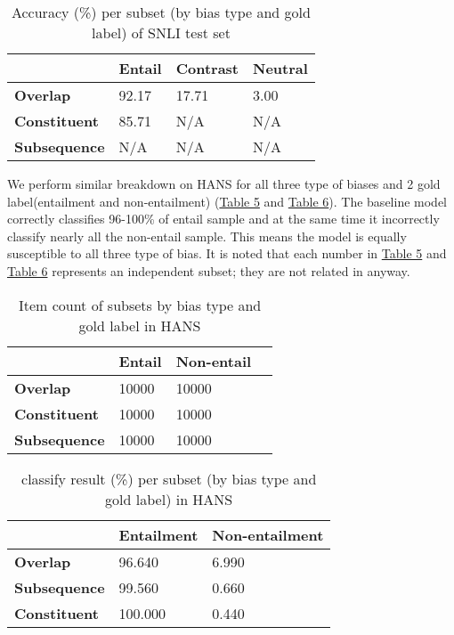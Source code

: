 \documentclass{article}
\begin{document}
\begin{table}[h]
    \caption{Accuracy (\%) per subset (by bias type and gold label) of SNLI test set}
    \label{table4}
\centering
\begin{tabular}{l l l l}
\hline
\textbf{} & \textbf{Entail} & \textbf{Contrast} & \textbf{Neutral} \\ \hline
\textbf{Overlap}     & 92.17         & 17.71           & 3.00           \\
\textbf{Constituent} & 85.71         & N/A               & N/A              \\
\textbf{Subsequence} & N/A             & N/A               & N/A              \\ \hline
\end{tabular}


\end{table}


We perform similar breakdown on HANS for all three type of biases and 2 gold label(entailment and non-entailment) (\hyperref[table5]{Table 5} and \hyperref[table6]{Table 6}).
The baseline model correctly classifies 96-100\% of entail sample and at the same time it incorrectly classify nearly all the non-entail sample.
This means the model is equally susceptible to all three type of bias.
It is noted that each number in \hyperref[table5]{Table 5} and \hyperref[table6]{Table 6} represents an independent subset; they are not related in anyway.

\begin{table}[H]
    \caption{Item count of subsets by bias type and gold label in HANS}
\label{table5}
\centering
\begin{tabular}{l l l l}
\hline
\textbf{}            & \textbf{Entail} & \textbf{Non-entail} \\ \hline
\textbf{Overlap}     & 10000    & 10000         \\
\textbf{Constituent} & 10000     & 10000              \\
\textbf{Subsequence} & 10000      & 10000             \\ \hline
\end{tabular}

\end{table}
\begin{table}[h]
    \label{table6}
    \caption{classify result (\%) per subset (by bias type and gold label) in HANS}
\centering
\begin{tabular}{l l l}
\hline
\textbf{} & \textbf{Entailment} & \textbf{Non-entailment} \\ \hline
\textbf{Overlap} & 96.640 & 6.990 \\
\textbf{Subsequence} & 99.560 & 0.660 \\
\textbf{Constituent} & 100.000 & 0.440 \\ \hline
\end{tabular}
\end{table}
\end{document}
